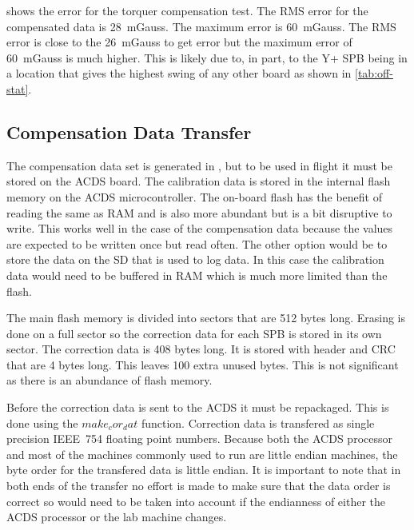  shows the error for the torquer compensation test. The RMS error for the compensated data is 28~mGauss. The maximum error is 60~mGauss. The RMS error is close to the 26~mGauss to get {\textdegree} error but the maximum error of 60~mGauss is much higher. This is likely due to, in part, to the Y+ \ac{SPB} being in a location that gives the highest swing of any other board as shown in \cref{tab:off-stat}.


\subsection{Compensation Data Transfer}

The compensation data set is generated in \matlab, but to be used in flight it must be stored on the \ac{ACDS} board. The calibration data is stored in the internal flash memory on the \ac{ACDS} microcontroller. The on-board flash has the benefit of reading the same as \ac{RAM} and is also more abundant but is a bit disruptive to write. This works well in the case of the compensation data because the values are expected to be written once but read often. The other option would be to store the data on the \ac{SD} that is used to log data. In this case the calibration data would need to be buffered in \ac{RAM} which is much more limited than the flash. 

The main flash memory is divided into sectors that are 512 bytes long. Erasing is done on a full sector so the correction data for each \ac{SPB} is stored in its own sector. The correction data is 408 bytes long. It is stored with header and \ac{CRC} that are 4 bytes long. This leaves 100 extra unused bytes. This is not significant as there is an abundance of flash memory.

Before the correction data is sent to the \ac{ACDS} it must be repackaged. This is done using the \lstMat$make_cor_dat$ function. Correction data is transfered as single precision IEEE~754 floating point numbers. Because both the \ac{ACDS} processor and most of the machines commonly used to run \matlab are little endian machines, the byte order for the transfered data is little endian. It is important to note that in both ends of the transfer no effort is made to make sure that the data order is correct so would need to be taken into account if the endianness of either the \ac{ACDS} processor or the lab machine changes.

